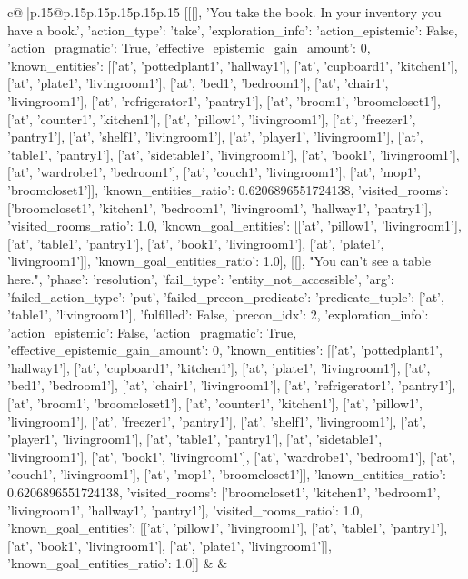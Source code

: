 \documentclass{article}
\begin{document}
{\begin{supertabular}{c@{$\;$}|p{.15\linewidth}@{}p{.15\linewidth}p{.15\linewidth}p{.15\linewidth}p{.15\linewidth}p{.15\linewidth}}
{{{	 [[[], 'You take the book. In your inventory you have a book.', {'action_type': 'take', 'exploration_info': {'action_epistemic': False, 'action_pragmatic': True, 'effective_epistemic_gain_amount': 0, 'known_entities': [['at', 'pottedplant1', 'hallway1'], ['at', 'cupboard1', 'kitchen1'], ['at', 'plate1', 'livingroom1'], ['at', 'bed1', 'bedroom1'], ['at', 'chair1', 'livingroom1'], ['at', 'refrigerator1', 'pantry1'], ['at', 'broom1', 'broomcloset1'], ['at', 'counter1', 'kitchen1'], ['at', 'pillow1', 'livingroom1'], ['at', 'freezer1', 'pantry1'], ['at', 'shelf1', 'livingroom1'], ['at', 'player1', 'livingroom1'], ['at', 'table1', 'pantry1'], ['at', 'sidetable1', 'livingroom1'], ['at', 'book1', 'livingroom1'], ['at', 'wardrobe1', 'bedroom1'], ['at', 'couch1', 'livingroom1'], ['at', 'mop1', 'broomcloset1']], 'known_entities_ratio': 0.6206896551724138, 'visited_rooms': ['broomcloset1', 'kitchen1', 'bedroom1', 'livingroom1', 'hallway1', 'pantry1'], 'visited_rooms_ratio': 1.0, 'known_goal_entities': [['at', 'pillow1', 'livingroom1'], ['at', 'table1', 'pantry1'], ['at', 'book1', 'livingroom1'], ['at', 'plate1', 'livingroom1']], 'known_goal_entities_ratio': 1.0}}], [[], "You can't see a table here.", {'phase': 'resolution', 'fail_type': 'entity_not_accessible', 'arg': {'failed_action_type': 'put', 'failed_precon_predicate': {'predicate_tuple': ['at', 'table1', 'livingroom1'], 'fulfilled': False, 'precon_idx': 2}}, 'exploration_info': {'action_epistemic': False, 'action_pragmatic': True, 'effective_epistemic_gain_amount': 0, 'known_entities': [['at', 'pottedplant1', 'hallway1'], ['at', 'cupboard1', 'kitchen1'], ['at', 'plate1', 'livingroom1'], ['at', 'bed1', 'bedroom1'], ['at', 'chair1', 'livingroom1'], ['at', 'refrigerator1', 'pantry1'], ['at', 'broom1', 'broomcloset1'], ['at', 'counter1', 'kitchen1'], ['at', 'pillow1', 'livingroom1'], ['at', 'freezer1', 'pantry1'], ['at', 'shelf1', 'livingroom1'], ['at', 'player1', 'livingroom1'], ['at', 'table1', 'pantry1'], ['at', 'sidetable1', 'livingroom1'], ['at', 'book1', 'livingroom1'], ['at', 'wardrobe1', 'bedroom1'], ['at', 'couch1', 'livingroom1'], ['at', 'mop1', 'broomcloset1']], 'known_entities_ratio': 0.6206896551724138, 'visited_rooms': ['broomcloset1', 'kitchen1', 'bedroom1', 'livingroom1', 'hallway1', 'pantry1'], 'visited_rooms_ratio': 1.0, 'known_goal_entities': [['at', 'pillow1', 'livingroom1'], ['at', 'table1', 'pantry1'], ['at', 'book1', 'livingroom1'], ['at', 'plate1', 'livingroom1']], 'known_goal_entities_ratio': 1.0}}]] 
	  } 
	   } 
	   } 
	 & & \\ 
 


\end{supertabular}}
\end{document}
